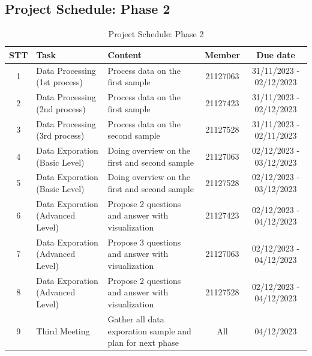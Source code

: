 \documentclass[13pt]{article}
\begin{document}
\subsection{Project Schedule: Phase 2}
\begin{table}[H]
    \centering
    \begin{tabular}{|c|p{4cm}|p{5cm}|c|c|}
    \hline
       \textbf{STT} & \textbf{Task} & \textbf{Content} & \textbf{Member} & \textbf{Due date}\\
    \hline
        1 & Data Processing (1st process) & Process data on the first sample & 21127063 & 31/11/2023 - 02/12/2023\\
    \hline
        2 & Data Processing (2nd process) & Process data on the first sample & 21127423 & 31/11/2023 - 02/12/2023\\
    \hline
        3 & Data Processing (3rd process) & Process data on the second sample & 21127528 & 31/11/2023 - 02/11/2023\\
    \hline
        4 & Data Exporation (Basic Level) & Doing overview on the first and second sample & 
        21127063 & 02/12/2023 - 03/12/2023\\
    \hline
        5 & Data Exporation (Basic Level) & Doing overview on the first and second sample & 
        21127528 & 02/12/2023 - 03/12/2023\\
    \hline
        6 & Data Exporation (Advanced Level) & Propose 2 questions and answer with visualization & 21127423 & 02/12/2023 - 04/12/2023\\
    \hline
        7 & Data Exporation (Advanced Level) & Propose 3 questions and answer with visualization & 21127063 & 02/12/2023 - 04/12/2023\\
    \hline
        8 & Data Exporation (Advanced Level) & Propose 2 questions and answer with visualization & 21127528 & 02/12/2023 - 04/12/2023\\
    \hline
        9 & Third Meeting & Gather all data exporation sample and plan for next phase & All & 04/12/2023\\
    \hline
    \end{tabular}
    \caption{Project Schedule: Phase 2}
    \label{tab:mytable}
\end{table}
\end{document}
